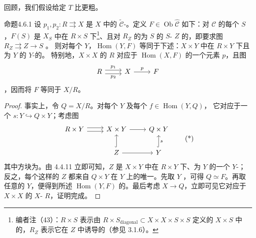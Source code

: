 回顾，我们假设给定 $T$ 比更粗。
\begin{SGAresult}{命题}{4.6.1}
设 $p_1,p_2:R\rightrightarrows X$ 是 $X$ 中的 $\widetilde{\mathcal C}$-。定义 $F\in\operatorname{Ob}\widehat{\mathcal C}$ 如下：对 $\mathcal C$ 的每个 $S$，$F(S)$ 是 $X_S$ 中在 $R\times S$ 下\footnote{编者注（43）：$R\times S$ 表示由 $R\times S_{\mathrm{diagonal}}\subset X\times X\times S\times S$ 定义的 $X\times S$ 中的，$R_Z$ 表示它在 $Z$ 中诱导的（参见 3.1.6）。}、且对 $R_Z$ 的为 $S$ 的 $S$- $Z$ 的，即要求图 $R_Z\rightrightarrows Z\to S$ 。
则对每个 $Y$，$\operatorname{Hom}(Y,F)$ 等同于下述：$X\times Y$ 中在 $R\times Y$ 下且为 $Y$ 的 $Y$-的。
特别地，$X\times X$ 的 $R$ 对应于 $\operatorname{Hom}(X,F)$ 的一个元素 $p$，且图
\[
\begin{tikzcd}
R\arrow[r,shift left=.6ex,"p_1"]\arrow[r,shift right=.6ex,"p_2"']&X\arrow[r,"p"]&F
\end{tikzcd}
\]
，因而将 $F$ 等同于 $X/R$。
\end{SGAresult}
\begin{proof}
事实上，令 $Q=X/R$。对每个 $Y$ 及每个 $f\in\operatorname{Hom}(Y,Q)$，
它对应于一个 $s:Y\hookrightarrow Q\times Y$；考虑图
\[
\begin{tikzcd}
R\times Y\arrow[r,shift left=.6ex]\arrow[r,shift right=.6ex]&X\times Y\arrow[r]&Q\times Y\\
&Z\arrow[u,hook]\arrow[r]&Y\arrow[u,hook,"s"']
\end{tikzcd}\tag{*}
\]
其中方块为。由 4.4.11 立即可知，$Z$ 是 $X\times Y$ 中在 $R\times Y$ 下、为 $Y$ 的一个 $Y$-；反之，每个这样的 $Z$ 都来自 $Q\times Y$ 在 $Y$ 上的唯一。先取 $Y$ ，可得 $Q\simeq F$。再取任意的 $Y$，便得到所述 $\operatorname{Hom}(Y,F)$ 的。最后考虑 $X\to Q$，立即可见它对应于 $X\times X$ 的 $X$- $R$，证明完成。
\end{proof}
